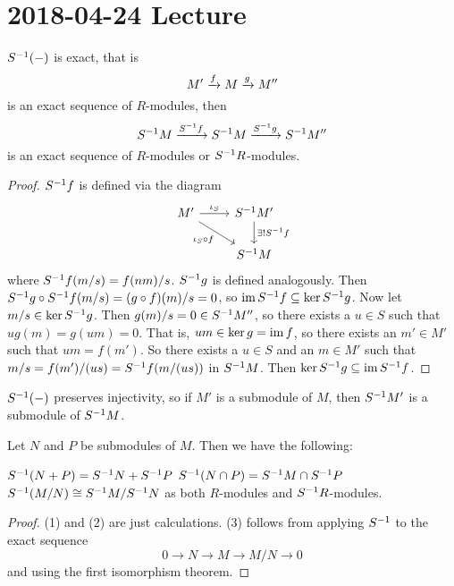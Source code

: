\section{2018-04-24 Lecture}

\begin{prop}[2.6]
  $S^{-1}(-)$ is exact, that is
  \[M' \xrightarrow{f} M \xrightarrow{g} M''\]
  is an exact sequence of $R$-modules, then
  \[S^{-1} M \xrightarrow{S^{-1} f} S^{-1} M \xrightarrow{S^{-1} g} S^{-1} M''\]
  is an exact sequence of $R$-modules or $S^{-1} R$-modules.
\end{prop}

\begin{proof}
  $S^{-1} f$ is defined via the diagram
  \[\begin{tikzcd}
    M' \arrow[rd, "\iota_S \circ f"'] \arrow[r, "\iota_S"] & S\inv M' \arrow[d, "\exists ! S\inv f"] \\
     & S\inv M
  \end{tikzcd}\]
  where $S^{-1} f(m/s) = f(nm)/s$.
  $S^{-1} g$ is defined analogously.
  Then $S^{-1} g \circ S^{-1} f (m/s) = (g \circ f)(m)/s = 0$, so $\operatorname{im} S^{-1} f \subseteq \ker S^{-1} g$.
  Now let $m/s \in \ker S^{-1} g$.
  Then $g(m)/s = 0 \in S^{-1} M''$, so there exists a $u \in S$ such that $ug(m)=g(um)=0$.
  That is, $um \in \ker g = \operatorname{im} f$, so there exists an $m' \in M'$ such that $um=f(m')$.
  So there exists a $u \in S$ and an $m \in M'$ such that $m/s = f(m')/(us) = S^{-1} f(m/(us))$ in $S^{-1} M$.
  Then $\ker S^{-1} g \subseteq \operatorname{im} S^{-1} f$.
\end{proof}

\begin{rmk}
  $S^{-1}(-)$ preserves injectivity, so if $M'$ is a submodule of $M$, then $S^{-1} M'$ is a submodule of $S^{-1} M$.
\end{rmk}

\begin{cor}
  Let $N$ and $P$ be submodules of $M$.
  Then we have the following:
  \begin{enum}
    \io $S^{-1}(N+P)=S^{-1} N + S^{-1} P$
    \io $S^{-1}(N \cap P) = S^{-1} M \cap S^{-1} P$
    \io $S^{-1}(M/N) \cong S^{-1} M / S^{-1} N$ as both $R$-modules and $S^{-1} R$-modules.
  \end{enum}
\end{cor}

\begin{proof}
  (1) and (2) are just calculations.
  (3) follows from applying $S^{-1}$ to the exact sequence
  \[0 \to N \to M \to M/N \to 0\]
  and using the first isomorphism theorem.
\end{proof}

